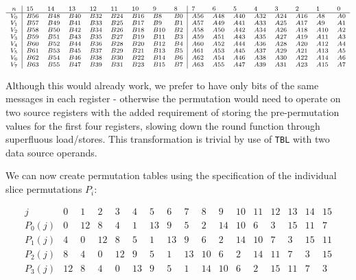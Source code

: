 \documentclass[12pt]{report}
\begin{document}
\[
    \scriptsize
    \begin{array}{c|llllllll|llllllll}
        n & 15 & 14 & 13 & 12 & 11 & 10 & 9 & 8 & 7 & 6 & 5 & 4 & 3 & 2 & 1 & 0 \\
        \hline
        V_0 & B56 & B48 & B40 & B32 & B24 & B16 & B8 & B0 & A56 & A48 & A40 & A32 & A24 & A16 & A8 & A0 \\
        V_1 & B57 & B49 & B41 & B33 & B25 & B17 & B9 & B1 & A57 & A49 & A41 & A33 & A25 & A17 & A9 & A1 \\
        V_2 & B58 & B50 & B42 & B34 & B26 & B18 & B10 & B2 & A58 & A50 & A42 & A34 & A26 & A18 & A10 & A2 \\
        V_3 & B59 & B51 & B43 & B35 & B27 & B19 & B11 & B3 & A59 & A51 & A43 & A35 & A27 & A19 & A11 & A3 \\
        V_4 & B60 & B52 & B44 & B36 & B28 & B20 & B12 & B4 & A60 & A52 & A44 & A36 & A28 & A20 & A12 & A4 \\
        V_5 & B61 & B53 & B45 & B37 & B29 & B21 & B13 & B5 & A61 & A53 & A45 & A37 & A29 & A21 & A13 & A5 \\
        V_6 & B62 & B54 & B46 & B38 & B30 & B22 & B14 & B6 & A62 & A54 & A46 & A38 & A30 & A22 & A14 & A6 \\
        V_7 & B63 & B55 & B47 & B39 & B31 & B23 & B15 & B7  & A63 & A55 & A47 & A39 & A31 & A23 & A15 & A7
    \end{array}
\]

Although this would already work, we prefer to have only bits of the same
messages in each register - otherwise the permutation would need to operate on
two source registers with the added requirement of storing the pre-permutation
values for the first four registers, slowing down the round function through
superfluous load/stores. This transformation is trivial by use of
\texttt{TBL} with two data source operands.

We can now create permutation tables using the specification of the individual
slice permutations $P_i$:

\[
    \begin{array}{c|llllllllllllllll}
        j & 0 & 1 & 2 & 3 & 4 & 5 & 6 & 7 & 8 & 9 & 10 & 11 & 12 & 13 & 14 & 15 \\
        \hline
        P_0(j) & 0 & 12 & 8 & 4 & 1 & 13 & 9 & 5 & 2 & 14 & 10 & 6 & 3 & 15 & 11 & 7 \\
        P_1(j) & 4 & 0 & 12 & 8 & 5 & 1 & 13 & 9 & 6 & 2 & 14 & 10 & 7 & 3 & 15 & 11 \\
        P_2(j) & 8 & 4 & 0 & 12 & 9 & 5 & 1 & 13 & 10 & 6 & 2 & 14 & 11 & 7 & 3 & 15 \\
        P_3(j) & 12 & 8 & 4 & 0 & 13 & 9 & 5 & 1 & 14 & 10 & 6 & 2 & 15 & 11 & 7 & 3
    \end{array}
\]
\end{document}
